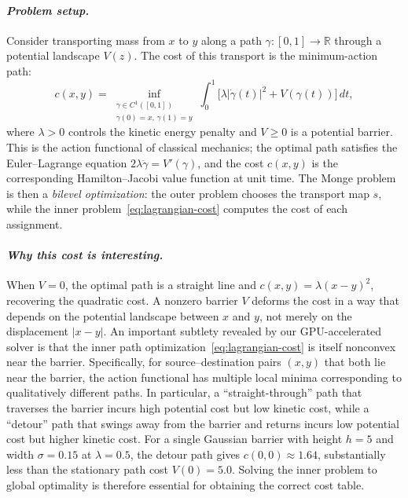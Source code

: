 \documentclass[12pt,leqno]{amsart}
\begin{document}
\paragraph{\it Problem setup.}
Consider transporting mass from $x$ to $y$ along a path $\gamma:[0,1] \to \mathbb{R}$ through a potential landscape $V(z)$.  The cost of this transport is the minimum-action path:
\begin{equation}\label{eq:lagrangian-cost}
    c(x,y) = \inf_{\substack{\gamma \in C^1([0,1]) \\ \gamma(0)=x,\, \gamma(1)=y}}
    \int_0^1 \bigl[\lambda |\dot\gamma(t)|^2 + V(\gamma(t))\bigr]\, dt,
\end{equation}
where $\lambda > 0$ controls the kinetic energy penalty and $V \geq 0$ is a potential barrier.
This is the action functional of classical mechanics; the optimal path satisfies the Euler--Lagrange equation $2\lambda\ddot\gamma = V'(\gamma)$, and the cost $c(x,y)$ is the corresponding Hamilton--Jacobi value function at unit time.
The Monge problem is then a \emph{bilevel optimization}: the outer problem chooses the transport map $s$, while the inner problem~\eqref{eq:lagrangian-cost} computes the cost of each assignment.

\paragraph{\it Why this cost is interesting.}
When $V = 0$, the optimal path is a straight line and $c(x,y) = \lambda(x-y)^2$, recovering the quadratic cost.  A nonzero barrier $V$ deforms the cost in a way that depends on the potential landscape between $x$ and $y$, not merely on the displacement $|x-y|$.  An important subtlety revealed by our GPU-accelerated solver is that the inner path optimization~\eqref{eq:lagrangian-cost} is itself nonconvex near the barrier. Specifically, for source--destination pairs $(x,y)$ that both lie near the barrier, the action functional has multiple local minima corresponding to qualitatively different paths.  In particular, a ``straight-through'' path that traverses the barrier incurs high potential cost but low kinetic cost, while a ``detour'' path that swings away from the barrier and returns incurs low potential cost but higher kinetic cost.  For a single Gaussian barrier with height $h = 5$ and width $\sigma = 0.15$ at $\lambda = 0.5$, the detour path gives $c(0,0) \approx 1.64$, substantially less than the stationary path cost $V(0) = 5.0$.  Solving the inner problem to global optimality is therefore essential for obtaining the correct cost table.
\end{document}
